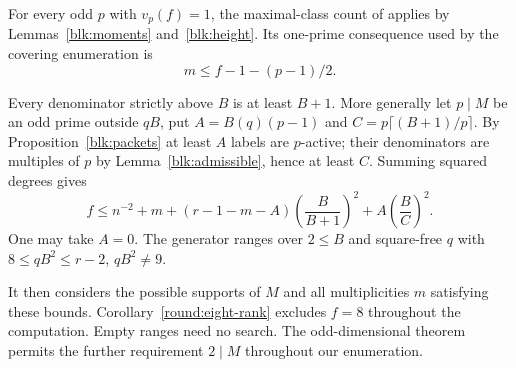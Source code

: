 \documentclass[11pt]{amsart}
\numberwithin{equation}{section}
\theoremstyle{definition}
\theoremstyle{plain}
\begin{document}
For every odd $p$ with $v_p(f)=1$, the maximal-class count of
\cite[Proposition~19.9]{BDPcore} applies by Lemmas~\ref{blk:moments}
and~\ref{blk:height}. Its one-prime consequence used by the covering
enumeration is
\begin{equation}\label{eq:startmult}
 m\le f-1-(p-1)/2 .
\end{equation}

Every denominator strictly above $B$ is at least $B+1$. More generally let
$p\mid M$ be an odd prime outside $qB$, put $A=B(q)(p-1)$ and
$C=p\lceil(B+1)/p\rceil$. By Proposition~\ref{blk:packets} at
least $A$ labels are $p$-active; their denominators are multiples of $p$
by Lemma~\ref{blk:admissible}, hence at least $C$. Summing squared degrees gives
\begin{equation}\label{eq:startgap}
 f\le n^{-2}+m+(r-1-m-A)\left(\frac{B}{B+1}\right)^2
                     +A\left(\frac{B}{C}\right)^2 .
\end{equation}
One may take $A=0$. The generator ranges over $2\le B$ and square-free
$q$ with $8\le qB^2\le r-2$, $qB^2\ne9$.

It then considers the possible supports of $M$ and all multiplicities $m$ satisfying these bounds. Corollary~\ref{round:eight-rank} excludes $f=8$ throughout the computation. Empty ranges need no search. The odd-dimensional theorem permits the further requirement $2\mid M$ throughout our enumeration.
\end{document}
